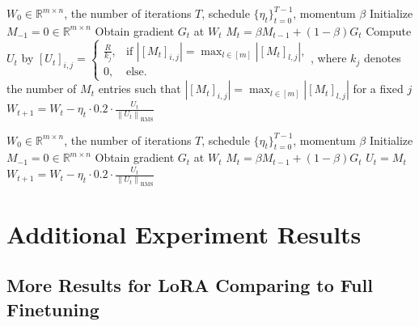 \documentclass{article}
\theoremstyle{remark}
\newcommand{\Norm}[1]{\left\|#1\right\|}
\newcommand{\Abs}[1]{\left\vert #1 \right\vert}
\newcommand{\RR}{\mathbb{R}}
\newcommand{\cA}{\mathcal{A}}
\begin{document}
\begin{algorithm}[ht]
   \caption{Column Max Descent ($\cA_{\infty,\infty}$)}
   \label{alg:cA_infinf}
\begin{algorithmic}[1]
    $W_0\in \RR^{m\times n}$, the number of iterations $T$, schedule $\{\eta_t\}_{t=0}^{T-1}$, momentum $\beta$
   \STATE Initialize $M_{-1}=0 \in \RR^{m\times n}$
   \STATE Obtain gradient $G_t$ at $W_t$
   \STATE $M_t = \beta M_{t-1} + (1 - \beta) G_t$
   \STATE Compute $U_t$ by $[U_t]_{i,j} = \begin{cases}
        \frac{R}{k_j}, & \text{if } \Abs{[M_t]_{i,j}} = \max_{l \in [m]} \Abs{[M_t]_{l,j}}, \\
        0, & \text{else.} \end{cases}$, where $k_j$ denotes the number of $M_t$ entries such that $\Abs{[M_t]_{i,j}} = \max_{l \in [m]} \Abs{[M_t]_{l,j}}$ for a fixed $j$
   \STATE
   $W_{t+1} = W_t - \eta_t \cdot 0.2 \cdot \frac{U_t}{\Norm{U_t}_{\mathrm{RMS}}}$
   \ENDFOR
\end{algorithmic}
\end{algorithm}

\begin{algorithm}[ht]
   \caption{SGD (with update RMS norm alignment)}
   \label{alg:sgd}
\begin{algorithmic}[1]
    $W_0\in \RR^{m\times n}$, the number of iterations $T$, schedule $\{\eta_t\}_{t=0}^{T-1}$, momentum $\beta$
   \STATE Initialize $M_{-1}=0 \in \RR^{m\times n}$
   \STATE Obtain gradient $G_t$ at $W_t$
   \STATE $M_t = \beta M_{t-1} + (1 - \beta) G_t$
   \STATE $U_t = M_t$
   \STATE
   $W_{t+1} = W_t - \eta_t \cdot 0.2 \cdot \frac{U_t}{\Norm{U_t}_{\mathrm{RMS}}}$
   \ENDFOR
\end{algorithmic}
\end{algorithm}





\section{Additional Experiment Results}\label{appendix:additional_experiment_results}


\subsection{More Results for LoRA Comparing to Full Finetuning}\label{appendix:reproduction_lora_forgets_less}
\end{document}
